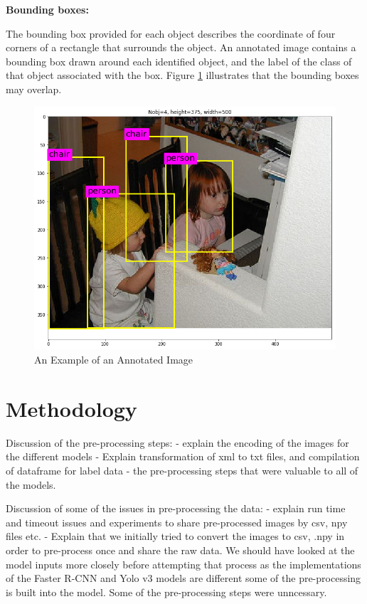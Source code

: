 \documentclass{article}
\begin{document}
\textbf{Bounding boxes:}

The bounding box provided for each object describes the coordinate of four corners of a rectangle that surrounds the object. An annotated image contains a bounding box drawn around each identified object, and the label of the class of that object associated with the box. Figure \ref{fig:bounding_boxes} illustrates that the bounding boxes may overlap.

\begin{figure}[h]
  \includegraphics[scale = 0.3]{bbox_example.png}
  \centering
  \caption{An Example of an Annotated Image}
  \label{fig:bounding_boxes}
\end{figure}


\section{Methodology}

Discussion of the pre-processing steps:
- explain the encoding of the images for the different models
- Explain transformation of xml to txt files, and compilation of dataframe for label data - the pre-processing steps that were valuable to all of the models.

Discussion of some of the issues in pre-processing the data:
- explain run time and timeout issues and experiments to share pre-processed images by csv, npy files etc.
- Explain that we initially tried to convert the images to csv, .npy in order to pre-process once and share the raw data. We should have looked at the model inputs more closely before attempting that process as the implementations of the Faster R-CNN and Yolo v3 models are different some of the pre-processing is built into the model. Some of the pre-processing steps were unncessary.
\end{document}
